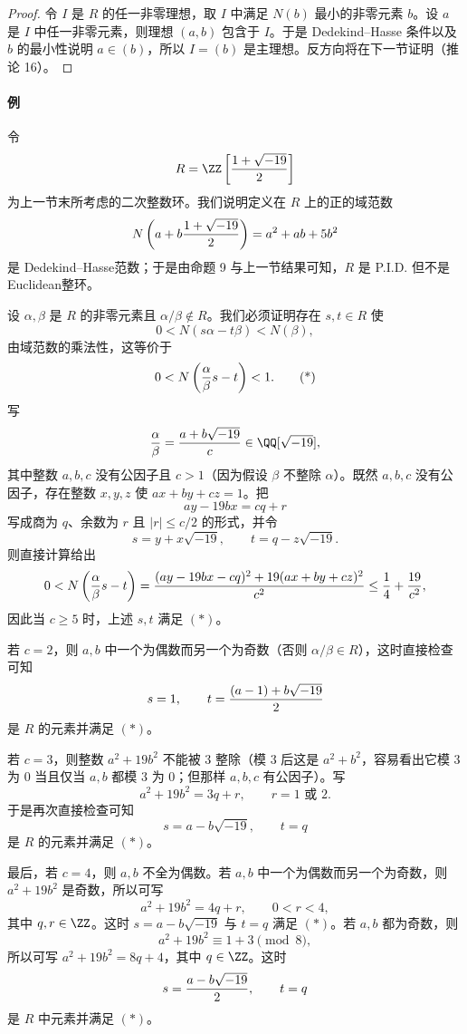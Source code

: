 \begin{proof}
	令 $I$ 是 $R$ 的任一非零理想，取 $I$ 中满足 $N(b)$ 最小的非零元素 $b$。设 $a$ 是 $I$ 中任一非零元素，则理想 $(a,b)$ 包含于 $I$。于是 Dedekind--Hasse 条件以及 $b$ 的最小性说明 $a\in(b)$，所以 $I=(b)$ 是主理想。反方向将在下一节证明（推论 16）。
\end{proof}

\paragraph{例}
令
\[
R=\ZZ\left[{1+\sqrt{-19}\over2}\right]
\]
为上一节末所考虑的二次整数环。我们说明定义在 $R$ 上的正的域范数
\[
N\left(a+b{1+\sqrt{-19}\over2}\right)=a^2+ab+5b^2
\]
是 Dedekind--Hasse范数；于是由命题 9 与上一节结果可知，$R$ 是 P.I.D. 但不是 Euclidean整环。

设 $\alpha,\beta$ 是 $R$ 的非零元素且 $\alpha/\beta\notin R$。我们必须证明存在 $s,t\in R$ 使
\[
0<N(s\alpha-t\beta)<N(\beta),
\]
由域范数的乘法性，这等价于
\[
0<N\left({\alpha\over\beta}s-t\right)<1. \tag{*}
\]
写
\[
{\alpha\over\beta}={a+b\sqrt{-19}\over c}\in \QQ[\sqrt{-19}],
\]
其中整数 $a,b,c$ 没有公因子且 $c>1$（因为假设 $\beta$ 不整除 $\alpha$）。既然 $a,b,c$ 没有公因子，存在整数 $x,y,z$ 使 $ax+by+cz=1$。把
\[
ay-19bx=cq+r
\]
写成商为 $q$、余数为 $r$ 且 $|r|\leq c/2$ 的形式，并令
\[
s=y+x\sqrt{-19},\qquad t=q-z\sqrt{-19}.
\]
则直接计算给出
\[
0<N\left({\alpha\over\beta}s-t\right)
={ (ay-19bx-cq)^2+19(ax+by+cz)^2\over c^2}
\leq {1\over4}+{19\over c^2},
\]
因此当 $c\geq5$ 时，上述 $s,t$ 满足 $(*)$。

若 $c=2$，则 $a,b$ 中一个为偶数而另一个为奇数（否则 $\alpha/\beta\in R$），这时直接检查可知
\[
s=1,
\qquad
 t={ (a-1)+b\sqrt{-19}\over2}
\]
是 $R$ 的元素并满足 $(*)$。

若 $c=3$，则整数 $a^2+19b^2$ 不能被 $3$ 整除（模 $3$ 后这是 $a^2+b^2$，容易看出它模 $3$ 为 $0$ 当且仅当 $a,b$ 都模 $3$ 为 $0$；但那样 $a,b,c$ 有公因子）。写
\[
a^2+19b^2=3q+r,
\qquad r=1\text{ 或 }2.
\]
于是再次直接检查可知
\[
s=a-b\sqrt{-19},
\qquad t=q
\]
是 $R$ 的元素并满足 $(*)$。

最后，若 $c=4$，则 $a,b$ 不全为偶数。若 $a,b$ 中一个为偶数而另一个为奇数，则 $a^2+19b^2$ 是奇数，所以可写
\[
a^2+19b^2=4q+r,
\qquad 0<r<4,
\]
其中 $q,r\in\ZZ$。这时 $s=a-b\sqrt{-19}$ 与 $t=q$ 满足 $(*)$。若 $a,b$ 都为奇数，则
\[
a^2+19b^2\equiv 1+3 \pmod 8,
\]
所以可写 $a^2+19b^2=8q+4$，其中 $q\in\ZZ$。这时
\[
s={a-b\sqrt{-19}\over2},
\qquad t=q
\]
是 $R$ 中元素并满足 $(*)$。

